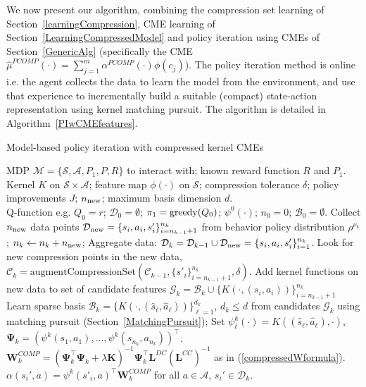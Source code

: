 \documentclass[letterpaper]{article}
\newcommand{\cD}{{\mathcal D}}
\newcommand{\cC}{{\mathcal C}}
\newcommand{\cB}{{\mathcal B}}
\newcommand{\cA}{{\mathcal A}}
\newcommand{\cS}{{\mathcal S}}
\newcommand{\cM}{{\mathcal M}}
\newcommand{\cG}{{\mathcal G}}
\newcommand{\bL}{{\bm L}}
\newcommand{\bK}{{\bm K}}
\newcommand{\bW}{{\bm W}}
\newcommand{\bPsi}{{\bm \Psi}}
\newcommand{\greedy}{\operatornamewithlimits{greedy}}
\begin{document}
We now present our algorithm, combining the compression set learning of Section~\ref{learningCompression}, CME learning of Section~\ref{LearningCompressedModel} and policy iteration using CMEs of Section~\ref{GenericAlg} (specifically the CME $\hat\mu^{PCOMP}(\cdot) = \sum_{j=1}^m \alpha^{PCOMP}(\cdot)\phi(c_j)$). The policy iteration method is online i.e. the agent collects the data to learn the model from the environment, and use that experience to incrementally build a suitable (compact) state-action representation using kernel matching pursuit. The algorithm is detailed in Algorithm~\ref{PIwCMEfeatures}.

\begin{algorithm}[h]
   \caption{Model-based policy iteration with compressed kernel CMEs}
   \label{PIwCMEfeatures}
\begin{algorithmic}
     MDP $\cM = \{\cS,\cA,P_1,P,R\}$ to interact with; known reward function $R$ and $P_1$.
    Kernel $K$ on $\cS\times\cA$; feature map $\phi(\cdot)$ on $\cS$; compression tolerance $\delta$; policy improvements $J$; $n_{\rm new}$; maximum basis dimension $d$.\\
	  Q-function e.g. $Q_0=r$; $\cD_0 = \emptyset$; $\pi_1 = {\greedy}(Q_0)$; $\psi^0(\cdot)$; $n_0=0$; $\cB_0 = \emptyset$.
	  Collect $n_{\rm new}$ data points $\cD_{\rm new} = \{s_i,a_i,s'_i\}_{i=n_{k-1}+1}^{n_k}$ from behavior policy distribution $\rho^{\nu_k}$; $n_k\leftarrow n_k+n_{\rm new}$; Aggregate data: $\cD_k = \cD_{k-1}\cup\cD_{\rm new} = \{s_i,a_i,s'_i\}_{i=1}^{n_k}$.
	  Look for new compression points in the new data, $\cC_k = \mbox{augmentCompressionSet}(\cC_{k-1},\{s'_i\}_{i=n_{k-1}+1}^{n_k},\delta)$.
	  Add kernel functions on new data to set of candidate features $\cG_k = \cB_k \cup \{ K(\cdot,(s_i,a_i)) \}_{i=n_{k-1}+1}^{n_k}$
	  Learn sparse basis $\cB_k = \{ K(\cdot,(\hat s_\ell,\hat a_\ell)) \}_{\ell = 1}^{d_k}$, $d_k\le d$ from candidates $\cG_k$ using matching pursuit (Section~\ref{MatchingPursuit}); Set $\psi_\ell^k(\cdot) = K((\hat s_\ell,\hat a_\ell),\cdot)$, $\bPsi_k=\left( \psi^k(s_1,a_1),...,\psi^k(s_{n_k},a_{n_k}) \right)^\top$.
	  $\bW^{COMP}_k = (\bPsi_k^\top \bPsi_k + \lambda \bK)^{-1}\bPsi_k^\top\bL^{DC}(\bL^{CC})^{-1}$ as in (\ref{compressedWformula}).
	  $\alpha(s_i',a) = \psi^k(s'_i,a)^\top \bW^{COMP}_k$ for all $a\in\cA$, $s_i'\in\cD_k$.

\end{algorithmic}
\end{algorithm}
\end{document}
